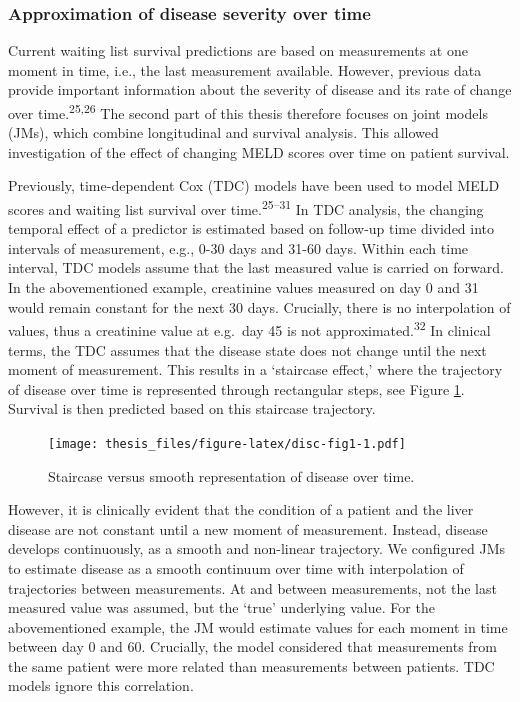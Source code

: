 \documentclass[11pt,english,]{book} %
\begin{document}
\hypertarget{approximation-of-disease-severity-over-time}{%
\subsubsection*{Approximation of disease severity over time}\label{approximation-of-disease-severity-over-time}}

Current waiting list survival predictions are based on measurements at one moment in time, i.e., the last measurement available. However, previous data provide important information about the severity of disease and its rate of change over time.\textsuperscript{25,26} The second part of this thesis therefore focuses on joint models (JMs), which combine longitudinal and survival analysis. This allowed investigation of the effect of changing MELD scores over time on patient survival.

Previously, time-dependent Cox (TDC) models have been used to model MELD scores and waiting list survival over time.\textsuperscript{25--31} In TDC analysis, the changing temporal effect of a predictor is estimated based on follow-up time divided into intervals of measurement, e.g., 0-30 days and 31-60 days. Within each time interval, TDC models assume that the last measured value is carried on forward. In the abovementioned example, creatinine values measured on day 0 and 31 would remain constant for the next 30 days. Crucially, there is no interpolation of values, thus a creatinine value at e.g.~day 45 is not approximated.\textsuperscript{32} In clinical terms, the TDC assumes that the disease state does not change until the next moment of measurement. This results in a `staircase effect,' where the trajectory of disease over time is represented through rectangular steps, see Figure \ref{fig:disc-fig1}. Survival is then predicted based on this staircase trajectory.

\begin{figure}
\centering
\texttt{[image: thesis\_files/figure-latex/disc-fig1-1.pdf]}
\caption{\label{fig:disc-fig1}Staircase versus smooth representation of disease over time.}
\end{figure}

However, it is clinically evident that the condition of a patient and the liver disease are not constant until a new moment of measurement. Instead, disease develops continuously, as a smooth and non-linear trajectory. We configured JMs to estimate disease as a smooth continuum over time with interpolation of trajectories between measurements. At and between measurements, not the last measured value was assumed, but the `true' underlying value. For the abovementioned example, the JM would estimate values for each moment in time between day 0 and 60. Crucially, the model considered that measurements from the same patient were more related than measurements between patients. TDC models ignore this correlation.
\end{document}
